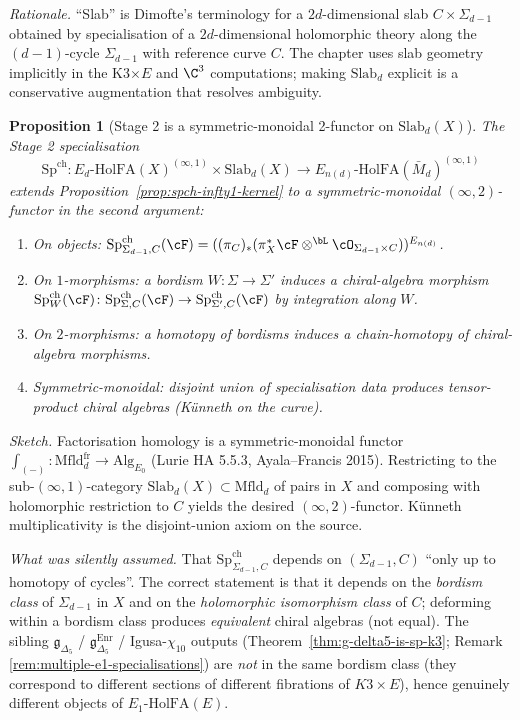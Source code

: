 \documentclass[11pt]{article}
\newtheorem{proposition}[theorem]{Proposition}
\theoremstyle{definition}
\providecommand{\SpCh}{\mathrm{Sp}^{\mathrm{ch}}}
\providecommand{\EdHolFA}{E_d\text{-}\mathrm{HolFA}}
\providecommand{\HolFA}{\mathrm{HolFA}}
\begin{document}
\emph{Rationale.} ``Slab'' is Dimofte's terminology for a
$2d$-dimensional slab $C \times \Sigma_{d-1}$ obtained by
specialisation of a $2d$-dimensional holomorphic theory along the
$(d-1)$-cycle $\Sigma_{d-1}$ with reference curve $C$.  The chapter
uses slab geometry implicitly in the K3$\times E$ and $\C^3$
computations; making $\mathrm{Slab}_d$ explicit is a conservative
augmentation that resolves ambiguity.

\begin{proposition}[Stage 2 is a symmetric-monoidal 2-functor on
$\mathrm{Slab}_d(X)$]
\label{prop:spch-slab-d-functor}
The Stage 2 specialisation
\[
 \SpCh\colon \EdHolFA(X)^{(\infty,1)} \times \mathrm{Slab}_d(X)
 \longrightarrow E_{n(d)}\text{-}\HolFA(\bar M_d)^{(\infty,1)}
\]
extends Proposition~\ref{prop:spch-infty1-kernel} to a symmetric-monoidal
$(\infty, 2)$-functor in the second argument:
\begin{enumerate}[label=\textup{(\arabic*)}]
\item On objects: $\SpCh_{\Sigma_{d-1}, C}(\cF) = ((\pi_C)_*(\pi_X^* \cF \otimes^{\bL} \cO_{\Sigma_{d-1} \times C}))^{E_{n(d)}}$.
\item On $1$-morphisms: a bordism $W\colon \Sigma \to \Sigma'$ induces a
chiral-algebra morphism $\SpCh_W(\cF)\colon \SpCh_{\Sigma, C}(\cF) \to
\SpCh_{\Sigma', C}(\cF)$ by integration along $W$.
\item On $2$-morphisms: a homotopy of bordisms induces a chain-homotopy
of chiral-algebra morphisms.
\item Symmetric-monoidal: disjoint union of specialisation data
produces tensor-product chiral algebras (K\"unneth on the curve).
\end{enumerate}
\end{proposition}

\emph{Sketch.} Factorisation homology is a symmetric-monoidal functor
$\int_{(-)}\colon \mathrm{Mfld}_d^{\mathrm{fr}} \to
\mathrm{Alg}_{E_0}$ (Lurie HA 5.5.3, Ayala--Francis 2015). Restricting
to the sub-$(\infty, 1)$-category $\mathrm{Slab}_d(X) \subset
\mathrm{Mfld}_d$ of pairs in $X$ and composing with holomorphic
restriction to $C$ yields the desired $(\infty, 2)$-functor.
K\"unneth multiplicativity is the disjoint-union axiom on the source.

\emph{What was silently assumed.} That
$\SpCh_{\Sigma_{d-1}, C}$ depends on $(\Sigma_{d-1}, C)$ ``only up to
homotopy of cycles''.  The correct statement is that it depends on
the \emph{bordism class} of $\Sigma_{d-1}$ in $X$ and on the
\emph{holomorphic isomorphism class} of $C$; deforming within a
bordism class produces \emph{equivalent} chiral algebras (not equal).
The sibling $\mathfrak g_{\Delta_5}$ / $\mathfrak g_{\Delta_5}^{\mathrm{Enr}}$
/ Igusa-$\chi_{10}$ outputs
(Theorem~\ref{thm:g-delta5-is-sp-k3}; Remark
\ref{rem:multiple-e1-specialisations}) are \emph{not} in the same
bordism class (they correspond to different sections of different
fibrations of $K3 \times E$), hence genuinely different objects of
$E_1\text{-}\HolFA(E)$.
\end{document}
